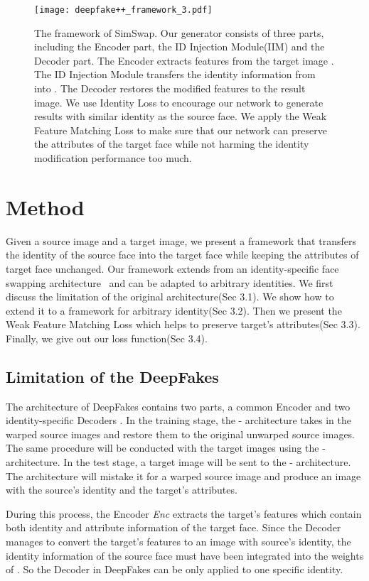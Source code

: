 \documentclass[sigconf]{acmart}
\begin{document}
\begin{figure*}[!ht] 
\centering
\texttt{[image: deepfake++\_framework\_3.pdf]}
\caption{The framework of SimSwap. Our generator consists of three parts, including the Encoder part, the ID Injection Module(IIM) and the Decoder part. The Encoder extracts features  from the target image . The ID Injection Module transfers the identity information from  into . The Decoder restores the modified features to the result image. We use Identity Loss to encourage our network to generate results with similar identity as the source face. We apply the Weak Feature Matching Loss to make sure that our network can preserve the attributes of the target face while not harming the identity modification performance too much.}
\label{fig:framework}
\end{figure*}

\section{Method}

Given a source image and a target image, we present a framework that transfers the identity of the source face into the target face while keeping the attributes of target face unchanged. Our framework extends from an identity-specific face swapping architecture~\cite{DeepFakes} and can be adapted to arbitrary identities. We first discuss the limitation of the original architecture(Sec 3.1). We show how to extend it to a framework for arbitrary identity(Sec 3.2). Then we present the Weak Feature Matching Loss which helps to preserve target's attributes(Sec 3.3). Finally, we give out our loss function(Sec 3.4).

\subsection{Limitation of the DeepFakes}

The architecture of DeepFakes contains two parts, a common Encoder  and two identity-specific Decoders . In the training stage, the - architecture takes in the warped source images and restore them to the original unwarped source images. The same procedure will be conducted with the target images using the - architecture. In the test stage, a target image will be sent to the - architecture. The architecture will mistake it for a warped source image and produce an image with the source's identity and the target's attributes. 

During this process, the Encoder \textit{Enc} extracts the target's features which contain both identity and attribute information of the target face. Since the Decoder  manages to convert the target's features to an image with source's identity, the identity information of the source face must have been integrated into the weights of . So the Decoder in DeepFakes can be only applied to one specific identity. 
\end{document}
